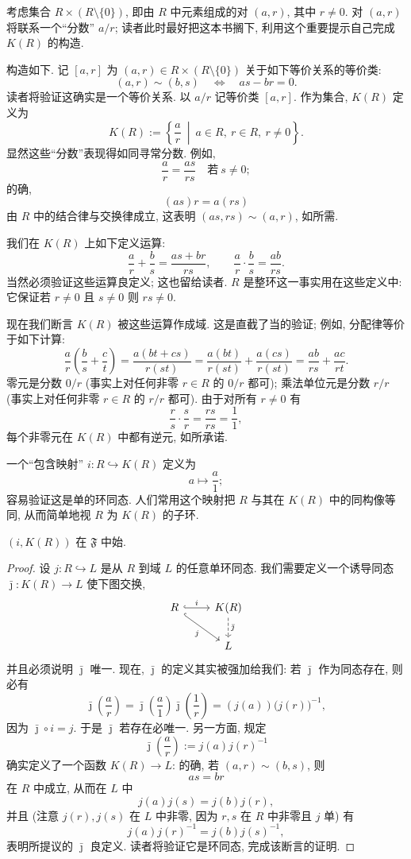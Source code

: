 \noindent 考虑集合 $R\times (R\setminus\{0\})$, 即由 $R$ 中元素组成的对 $(a,r)$, 其中 $r\neq 0$. 对 $(a,r)$ 将联系一个``分数'' $a/r$; 读者此时最好把这本书搁下, 利用这个重要提示自己完成 $K(R)$ 的构造.

\noindent 构造如下. 记 $[a,r]$ 为 $(a,r)\in R\times(R\setminus\{0\})$ 关于如下等价关系的等价类:
\[
(a,r)\sim (b,s) \quad\Longleftrightarrow\quad as-br=0.
\]
读者将验证这确实是一个等价关系. 以 $a/r$ 记等价类 $[a,r]$. 作为集合, $K(R)$ 定义为
\[
K(R) := \left\{\frac{a}{r}\ \middle|\ a\in R,\ r\in R,\ r\neq 0\right\}.
\]
显然这些``分数''表现得如同寻常分数. 例如,
\[
\frac{a}{r} = \frac{as}{rs}\quad \text{若}\ s\neq 0;
\]
的确,
\[
(as)r = a(rs)
\]
由 $R$ 中的结合律与交换律成立, 这表明 $(as,rs)\sim (a,r)$, 如所需.

\noindent 我们在 $K(R)$ 上如下定义运算:
\[
\frac{a}{r}+\frac{b}{s} = \frac{as+br}{rs},\qquad \frac{a}{r}\cdot\frac{b}{s} = \frac{ab}{rs}.
\]
当然必须验证这些运算良定义; 这也留给读者. $R$ 是整环这一事实用在这些定义中: 它保证若 $r\neq 0$ 且 $s\neq 0$ 则 $rs\neq 0$.

\noindent 现在我们断言 $K(R)$ 被这些运算作成域. 这是直截了当的验证; 例如, 分配律等价于如下计算:
\[
\frac{a}{r}\left(\frac{b}{s}+\frac{c}{t}\right) = \frac{a(bt+cs)}{r(st)} = \frac{a(bt)}{r(st)}+\frac{a(cs)}{r(st)} = \frac{ab}{rs}+\frac{ac}{rt}.
\]
零元是分数 $0/r$ (事实上对任何非零 $r\in R$ 的 $0/r$ 都可); 乘法单位元是分数 $r/r$ (事实上对任何非零 $r\in R$ 的 $r/r$ 都可). 由于对所有 $r\neq 0$ 有
\[
\frac{r}{s}\cdot\frac{s}{r} = \frac{rs}{rs} = \frac{1}{1},
\]
每个非零元在 $K(R)$ 中都有逆元, 如所承诺.

\noindent 一个``包含映射'' $i:R\hookrightarrow K(R)$ 定义为
\[
a\longmapsto \frac{a}{1};
\]
容易验证这是单的环同态. 人们常用这个映射把 $R$ 与其在 $K(R)$ 中的同构像等同, 从而简单地视 $R$ 为 $K(R)$ 的子环.

\begin{claim}\label{claim:field-of-fractions-universal}
$(i,K(R))$ 在 $\mathfrak{F}$ 中始.
\end{claim}

\begin{proof}
设 $j:R\hookrightarrow L$ 是从 $R$ 到域 $L$ 的任意单环同态. 我们需要定义一个诱导同态 $\bar\jmath:K(R)\to L$ 使下图交换,
\[
\begin{tikzcd}
R \ar[r,hook, "i"] \ar[dr,hook, "j"'] & K(R) \ar[d, "\bar\jmath", dashed] \\
& L
\end{tikzcd}
\]
并且必须说明 $\bar\jmath$ 唯一. 现在, $\bar\jmath$ 的定义其实被强加给我们: 若 $\bar\jmath$ 作为同态存在, 则必有
\[
\bar\jmath\left(\frac{a}{r}\right) = \bar\jmath\left(\frac{a}{1}\right)\bar\jmath\left(\frac{1}{r}\right) = (j(a))\bigl(j(r)\bigr)^{-1},
\]
因为 $\bar\jmath\circ i = j$. 于是 $\bar\jmath$ 若存在必唯一. 另一方面, 规定
\[
\bar\jmath\left(\frac{a}{r}\right) := j(a)j(r)^{-1}
\]
确实定义了一个函数 $K(R)\to L$: 的确, 若 $(a,r)\sim (b,s)$, 则
\[
as=br
\]
在 $R$ 中成立, 从而在 $L$ 中
\[
j(a)j(s)=j(b)j(r),
\]
并且 (注意 $j(r),j(s)$ 在 $L$ 中非零, 因为 $r,s$ 在 $R$ 中非零且 $j$ 单) 有
\[
j(a)j(r)^{-1}=j(b)j(s)^{-1},
\]
表明所提议的 $\bar\jmath$ 良定义. 读者将验证它是环同态, 完成该断言的证明.
\end{proof}

